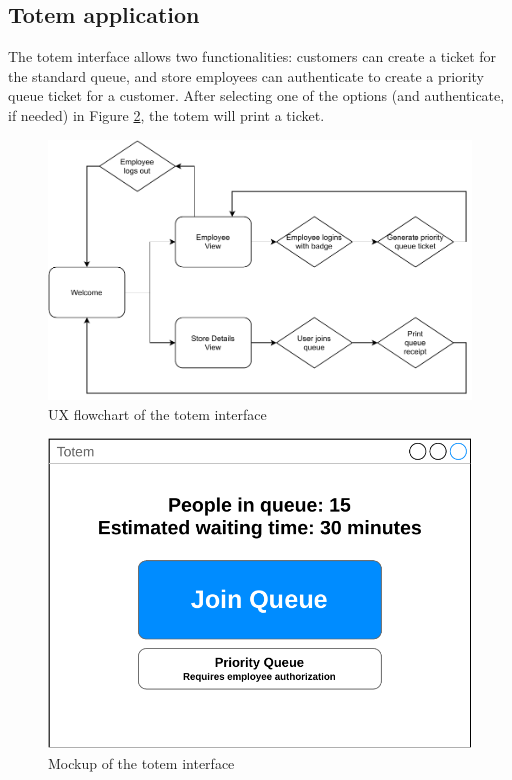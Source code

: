 \subsection{Totem application}

The totem interface allows two functionalities: customers can create a ticket for the standard queue, and store employees can authenticate to create a priority queue ticket for a customer. After selecting one of the options (and authenticate, if needed) in Figure \ref{fig:totem_mockup}, the totem will print a ticket.

\begin{figure}[H]
    \centering
    \includegraphics[width=\linewidth]{images/draw.io/ux_totem.pdf}
    \caption{UX flowchart of the totem interface}
    \label{fig:ux_totem}
\end{figure}

\begin{figure}[H]
    \centering
    \includegraphics[width=0.8\linewidth]{images/draw.io/totem_mockup.pdf}
    \caption{Mockup of the totem interface}
    \label{fig:totem_mockup}
\end{figure}

